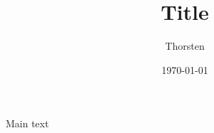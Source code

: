 \documentclass[a4paper,twocolumn]{scrartcl}
\title{{\Large Title}}
\author{{\normalsize Thorsten}}
\date{{\normalsize \today}}
\begin{document}
\maketitle


Main text
\end{document}
